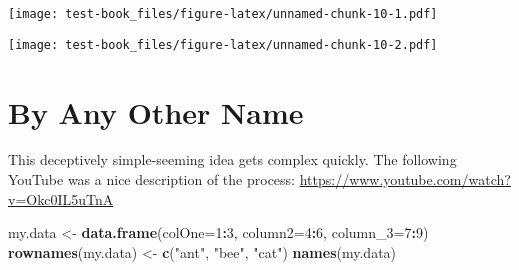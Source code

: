 \documentclass[]{book}
\newenvironment{Shaded}{\begin{snugshade}}{\end{snugshade}}
\newcommand{\CommentTok}[1]{\textcolor[rgb]{0.56,0.35,0.01}{\textit{#1}}}
\newcommand{\DataTypeTok}[1]{\textcolor[rgb]{0.13,0.29,0.53}{#1}}
\newcommand{\DecValTok}[1]{\textcolor[rgb]{0.00,0.00,0.81}{#1}}
\newcommand{\KeywordTok}[1]{\textcolor[rgb]{0.13,0.29,0.53}{\textbf{#1}}}
\newcommand{\NormalTok}[1]{#1}
\newcommand{\OperatorTok}[1]{\textcolor[rgb]{0.81,0.36,0.00}{\textbf{#1}}}
\newcommand{\StringTok}[1]{\textcolor[rgb]{0.31,0.60,0.02}{#1}}
\begin{document}
\texttt{[image: test-book\_files/figure-latex/unnamed-chunk-10-1.pdf]}

\begin{Shaded}
\end{Shaded}

\texttt{[image: test-book\_files/figure-latex/unnamed-chunk-10-2.pdf]}

\hypertarget{by-any-other-name}{%
\chapter{By Any Other Name}\label{by-any-other-name}}

This deceptively simple-seeming idea gets complex quickly. The following YouTube was a nice description of the process: \url{https://www.youtube.com/watch?v=Okc0IL5uTnA}

\begin{Shaded}
\begin{Highlighting}[]
\NormalTok{my.data <-}\StringTok{ }\KeywordTok{data.frame}\NormalTok{(}\DataTypeTok{colOne=}\DecValTok{1}\OperatorTok{:}\DecValTok{3}\NormalTok{, }\DataTypeTok{column2=}\DecValTok{4}\OperatorTok{:}\DecValTok{6}\NormalTok{, }\DataTypeTok{column_3=}\DecValTok{7}\OperatorTok{:}\DecValTok{9}\NormalTok{)}
\KeywordTok{rownames}\NormalTok{(my.data) <-}\StringTok{ }\KeywordTok{c}\NormalTok{(}\StringTok{"ant"}\NormalTok{, }\StringTok{"bee"}\NormalTok{, }\StringTok{"cat"}\NormalTok{)}
\KeywordTok{names}\NormalTok{(my.data)}
\end{Highlighting}
\end{Shaded}
\end{document}
